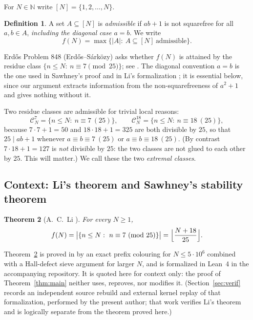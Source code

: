 \documentclass[11pt,a4paper]{article}
\theoremstyle{plain}
\newtheorem{theorem}{Theorem}[section]
\theoremstyle{definition}
\newtheorem{definition}[theorem]{Definition}
\theoremstyle{remark}
\newcommand{\N}{\mathbb{N}}
\begin{document}
For $N\in\N$ write $[N]=\{1,2,\dots,N\}$.

\begin{definition}\label{def:adm}
A set $A\subseteq[N]$ is \emph{admissible} if $ab+1$ is not squarefree for all $a,b\in A$,
\emph{including the diagonal case $a=b$}. We write
\[
 f(N)=\max\{|A|:\ A\subseteq[N]\ \text{admissible}\}.
\]
\end{definition}

Erd\H{o}s Problem 848 (Erd\H{o}s--S\'ark\"ozy) asks whether $f(N)$ is attained by the residue class
$\{n\le N:\ n\equiv 7\pmod{25}\}$; see \cite{ErdosProblem848}. The diagonal convention $a=b$ is the one used in
Sawhney's proof \cite{Sawhney} and in Li's formalization \cite{Li}; it is essential below, since our
argument extracts information from the non-squarefreeness of $a^2+1$ and gives nothing without it.

Two residue classes are admissible for trivial local reasons:
\[
 \mathcal{C}^{7}_N=\{n\le N:\ n\equiv 7\ (25)\},\qquad
 \mathcal{C}^{18}_N=\{n\le N:\ n\equiv 18\ (25)\},
\]
because $7\cdot 7+1=50$ and $18\cdot 18+1=325$ are both divisible by $25$, so that $25\mid ab+1$
whenever $a\equiv b\equiv 7\ (25)$ or $a\equiv b\equiv 18\ (25)$. (By contrast $7\cdot 18+1=127$ is
\emph{not} divisible by $25$: the two classes are not glued to each other by $25$. This will
matter.) We call these the two \emph{extremal classes}.

\subsection{Context: Li's theorem and Sawhney's stability theorem}

\begin{theorem}[A.~C.~Li \cite{Li}]\label{thm:li}
For every $N\ge 1$,
\[
 f(N)=\bigl|\{n\le N:\ n\equiv 7\ (\mathrm{mod}\ 25)\}\bigr|=\Bigl\lfloor \frac{N+18}{25}\Bigr\rfloor .
\]
\end{theorem}

Theorem~\ref{thm:li} is proved in \cite{Li} by an exact prefix colouring for $N\le 5\cdot 10^{6}$
combined with a Hall-defect sieve argument for larger $N$, and is formalized in Lean~4 in the
accompanying repository. It is quoted here for context only: the proof of
Theorem~\ref{thm:main} neither uses, reproves, nor modifies it.
(Section~\ref{sec:verif} records an independent source rebuild and external kernel replay of that
formalization, performed by the present author; that work verifies Li's theorem and is logically
separate from the theorem proved here.)
\end{document}

